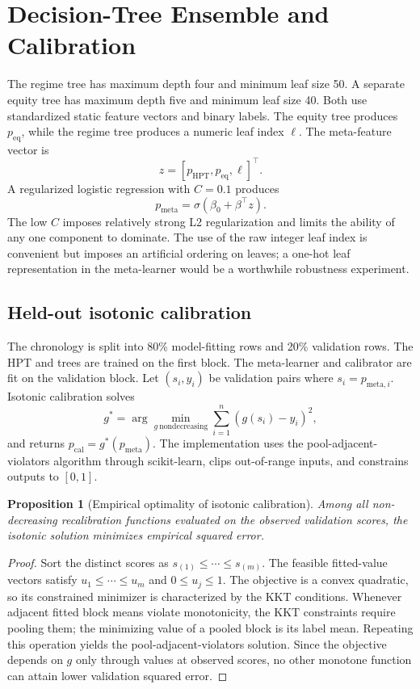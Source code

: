 \documentclass[11pt]{article}
\newtheorem{proposition}{Proposition}
\begin{document}
\section{Decision-Tree Ensemble and Calibration}
The regime tree has maximum depth four and minimum leaf size 50. A separate equity tree has maximum depth five and minimum leaf size 40. Both use standardized static feature vectors and binary labels. The equity tree produces $p_{\mathrm{eq}}$, while the regime tree produces a numeric leaf index $\ell$. The meta-feature vector is
\begin{equation}
 z=[p_{\mathrm{HPT}},p_{\mathrm{eq}},\ell]^\top.
\end{equation}
A regularized logistic regression with $C=0.1$ produces
\begin{equation}
 p_{\mathrm{meta}}=\sigma(\beta_0+\beta^\top z).
\end{equation}
The low $C$ imposes relatively strong L2 regularization and limits the ability of any one component to dominate. The use of the raw integer leaf index is convenient but imposes an artificial ordering on leaves; a one-hot leaf representation in the meta-learner would be a worthwhile robustness experiment.

\subsection{Held-out isotonic calibration}
The chronology is split into 80\% model-fitting rows and 20\% validation rows. The HPT and trees are trained on the first block. The meta-learner and calibrator are fit on the validation block. Let $(s_i,y_i)$ be validation pairs where $s_i=p_{\mathrm{meta},i}$. Isotonic calibration solves
\begin{equation}
 g^*=\arg\min_{g\ \mathrm{nondecreasing}}\sum_{i=1}^n(g(s_i)-y_i)^2,
\end{equation}
and returns $p_{\mathrm{cal}}=g^*(p_{\mathrm{meta}})$. The implementation uses the pool-adjacent-violators algorithm through scikit-learn, clips out-of-range inputs, and constrains outputs to $[0,1]$.

\begin{proposition}[Empirical optimality of isotonic calibration]
Among all non-decreasing recalibration functions evaluated on the observed validation scores, the isotonic solution minimizes empirical squared error.
\end{proposition}
\begin{proof}
Sort the distinct scores as $s_{(1)}\le\cdots\le s_{(m)}$. The feasible fitted-value vectors satisfy $u_1\le\cdots\le u_m$ and $0\le u_j\le1$. The objective is a convex quadratic, so its constrained minimizer is characterized by the KKT conditions. Whenever adjacent fitted block means violate monotonicity, the KKT constraints require pooling them; the minimizing value of a pooled block is its label mean. Repeating this operation yields the pool-adjacent-violators solution. Since the objective depends on $g$ only through values at observed scores, no other monotone function can attain lower validation squared error.
\end{proof}
\end{document}
